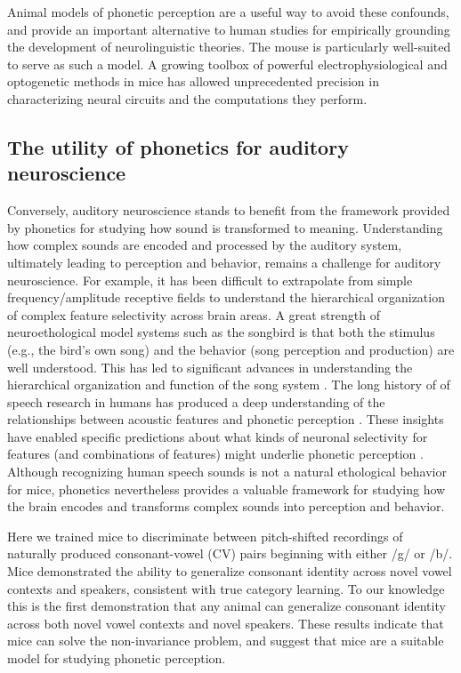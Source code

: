 Animal models of phonetic perception are a useful way to avoid these confounds, and provide an important alternative to human studies for empirically grounding the development of neurolinguistic theories. The mouse is particularly well-suited to serve as such a model. A growing toolbox of powerful electrophysiological and optogenetic methods in mice has allowed unprecedented precision in characterizing neural circuits and the computations they perform.

\subsection{The utility of phonetics for auditory neuroscience}

Conversely, auditory neuroscience stands to benefit from the framework provided by phonetics for studying how sound is transformed to meaning. Understanding how complex sounds are encoded and processed by the auditory system, ultimately leading to perception and behavior, remains a challenge for auditory neuroscience. For example, it has been difficult to extrapolate from simple frequency/amplitude receptive fields to understand the hierarchical organization of complex feature selectivity across brain areas. A great strength of neuroethological model systems such as the songbird is that both the stimulus (e.g., the bird's own song) and the behavior (song perception and production) are well understood. This has led to significant advances in understanding the hierarchical organization and function of the song system \citep{Brenowitz1997,Theunissen2014}. The long history of of speech research in humans has produced a deep understanding of the relationships between acoustic features and phonetic perception \citep{Peterson1952}. These insights have enabled specific predictions about what kinds of neuronal selectivity for features (and combinations of features) might underlie phonetic perception \citep{Sussman1998}. Although recognizing human speech sounds is not a natural ethological behavior for mice, phonetics nevertheless provides a valuable framework for studying how the brain encodes and transforms complex sounds into perception and behavior.

Here we trained mice to discriminate between pitch-shifted recordings of naturally produced consonant-vowel (CV) pairs beginning with either /g/ or /b/. Mice demonstrated the ability to generalize consonant identity across novel vowel contexts and speakers, consistent with true category learning. To our knowledge this is the first demonstration that any animal can generalize consonant identity across both novel vowel contexts and novel speakers. These results indicate that mice can solve the non-invariance problem, and suggest that mice are a suitable model for studying phonetic perception.

